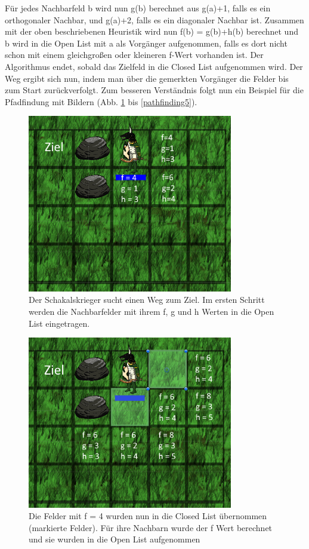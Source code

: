 \documentclass[extern,palatino]{cgBA}
\begin{document}
Für jedes Nachbarfeld b wird nun g(b) berechnet aus g(a)+1, falls es ein orthogonaler Nachbar, und g(a)+2, falls es ein diagonaler Nachbar ist. Zusammen mit der oben beschriebenen Heuristik wird nun f(b) = g(b)+h(b) berechnet und b wird in die Open List mit a als Vorgänger aufgenommen, falls es dort nicht schon mit einem gleichgroßen oder kleineren f-Wert vorhanden ist. Der Algorithmus endet, sobald das Zielfeld in die Closed List aufgenommen wird. Der Weg ergibt sich nun, indem man über die gemerkten Vorgänger die Felder bis zum Start zurückverfolgt. Zum besseren Verständnis folgt nun ein Beispiel für die Pfadfindung mit Bildern (Abb. \ref{pathfinding1} bis \ref{pathfinding5}).
\begin{figure}[H]
		\centering
		\includegraphics[width=0.8\textwidth]{pathfinding1.png}
		\caption{Der Schakalskrieger sucht einen Weg zum Ziel. Im ersten Schritt werden die Nachbarfelder mit ihrem f, g und h Werten in die Open List eingetragen.}
		\label{pathfinding1}
\end{figure}
\begin{figure}[H]
		\centering
		\includegraphics[width=0.8\textwidth]{pathfinding2.png}
		\caption{Die Felder mit f = 4 wurden nun in die Closed List übernommen (markierte Felder). Für ihre Nachbarn wurde der f Wert berechnet und sie wurden in die Open List aufgenommen}
		\label{pathfinding2}
\end{figure}
\end{document}
